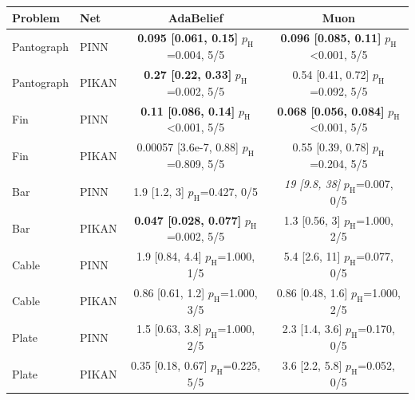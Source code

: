 \begin{tabular}{llcc}
\toprule
Problem & Net & AdaBelief & Muon\\
\midrule
Pantograph & PINN & \makecell{\textbf{0.095 [0.061, 0.15]}\\{\footnotesize $p_{\mathrm{H}}$=0.004, 5/5}} & \makecell{\textbf{0.096 [0.085, 0.11]}\\{\footnotesize $p_{\mathrm{H}}$<0.001, 5/5}}\\
Pantograph & PIKAN & \makecell{\textbf{0.27 [0.22, 0.33]}\\{\footnotesize $p_{\mathrm{H}}$=0.002, 5/5}} & \makecell{0.54 [0.41, 0.72]\\{\footnotesize $p_{\mathrm{H}}$=0.092, 5/5}}\\
Fin & PINN & \makecell{\textbf{0.11 [0.086, 0.14]}\\{\footnotesize $p_{\mathrm{H}}$<0.001, 5/5}} & \makecell{\textbf{0.068 [0.056, 0.084]}\\{\footnotesize $p_{\mathrm{H}}$<0.001, 5/5}}\\
Fin & PIKAN & \makecell{0.00057 [3.6e-7, 0.88]\\{\footnotesize $p_{\mathrm{H}}$=0.809, 5/5}} & \makecell{0.55 [0.39, 0.78]\\{\footnotesize $p_{\mathrm{H}}$=0.204, 5/5}}\\
Bar & PINN & \makecell{1.9 [1.2, 3]\\{\footnotesize $p_{\mathrm{H}}$=0.427, 0/5}} & \makecell{\textit{19 [9.8, 38]}\\{\footnotesize $p_{\mathrm{H}}$=0.007, 0/5}}\\
Bar & PIKAN & \makecell{\textbf{0.047 [0.028, 0.077]}\\{\footnotesize $p_{\mathrm{H}}$=0.002, 5/5}} & \makecell{1.3 [0.56, 3]\\{\footnotesize $p_{\mathrm{H}}$=1.000, 2/5}}\\
Cable & PINN & \makecell{1.9 [0.84, 4.4]\\{\footnotesize $p_{\mathrm{H}}$=1.000, 1/5}} & \makecell{5.4 [2.6, 11]\\{\footnotesize $p_{\mathrm{H}}$=0.077, 0/5}}\\
Cable & PIKAN & \makecell{0.86 [0.61, 1.2]\\{\footnotesize $p_{\mathrm{H}}$=1.000, 3/5}} & \makecell{0.86 [0.48, 1.6]\\{\footnotesize $p_{\mathrm{H}}$=1.000, 2/5}}\\
Plate & PINN & \makecell{1.5 [0.63, 3.8]\\{\footnotesize $p_{\mathrm{H}}$=1.000, 2/5}} & \makecell{2.3 [1.4, 3.6]\\{\footnotesize $p_{\mathrm{H}}$=0.170, 0/5}}\\
Plate & PIKAN & \makecell{0.35 [0.18, 0.67]\\{\footnotesize $p_{\mathrm{H}}$=0.225, 5/5}} & \makecell{3.6 [2.2, 5.8]\\{\footnotesize $p_{\mathrm{H}}$=0.052, 0/5}}\\
\bottomrule
\end{tabular}